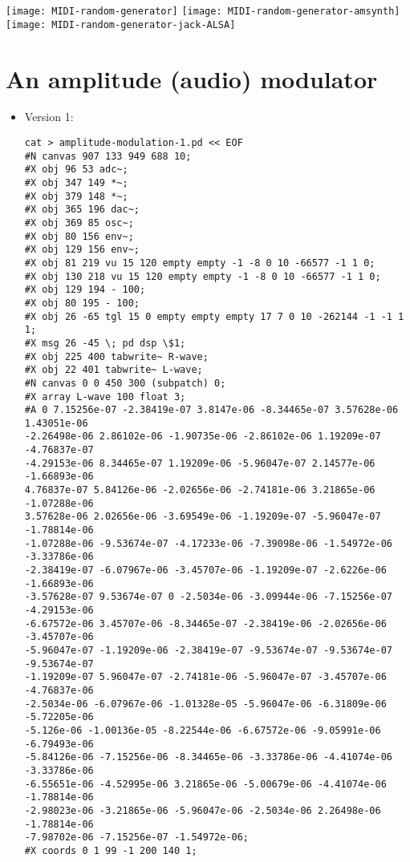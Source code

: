 \begin{center}
  \texttt{[image: MIDI-random-generator]}
  \texttt{[image: MIDI-random-generator-amsynth]}
  \texttt{[image: MIDI-random-generator-jack-ALSA]}
\end{center}


\section{An amplitude (audio) modulator}
\begin{itemize}
\item Version 1:
\begin{verbatim}
cat > amplitude-modulation-1.pd << EOF
#N canvas 907 133 949 688 10;
#X obj 96 53 adc~;
#X obj 347 149 *~;
#X obj 379 148 *~;
#X obj 365 196 dac~;
#X obj 369 85 osc~;
#X obj 80 156 env~;
#X obj 129 156 env~;
#X obj 81 219 vu 15 120 empty empty -1 -8 0 10 -66577 -1 1 0;
#X obj 130 218 vu 15 120 empty empty -1 -8 0 10 -66577 -1 1 0;
#X obj 129 194 - 100;
#X obj 80 195 - 100;
#X obj 26 -65 tgl 15 0 empty empty empty 17 7 0 10 -262144 -1 -1 1
1;
#X msg 26 -45 \; pd dsp \$1;
#X obj 225 400 tabwrite~ R-wave;
#X obj 22 401 tabwrite~ L-wave;
#N canvas 0 0 450 300 (subpatch) 0;
#X array L-wave 100 float 3;
#A 0 7.15256e-07 -2.38419e-07 3.8147e-06 -8.34465e-07 3.57628e-06 1.43051e-06
-2.26498e-06 2.86102e-06 -1.90735e-06 -2.86102e-06 1.19209e-07 -4.76837e-07
-4.29153e-06 8.34465e-07 1.19209e-06 -5.96047e-07 2.14577e-06 -1.66893e-06
4.76837e-07 5.84126e-06 -2.02656e-06 -2.74181e-06 3.21865e-06 -1.07288e-06
3.57628e-06 2.02656e-06 -3.69549e-06 -1.19209e-07 -5.96047e-07 -1.78814e-06
-1.07288e-06 -9.53674e-07 -4.17233e-06 -7.39098e-06 -1.54972e-06 -3.33786e-06
-2.38419e-07 -6.07967e-06 -3.45707e-06 -1.19209e-07 -2.6226e-06 -1.66893e-06
-3.57628e-07 9.53674e-07 0 -2.5034e-06 -3.09944e-06 -7.15256e-07 -4.29153e-06
-6.67572e-06 3.45707e-06 -8.34465e-07 -2.38419e-06 -2.02656e-06 -3.45707e-06
-5.96047e-07 -1.19209e-06 -2.38419e-07 -9.53674e-07 -9.53674e-07 -9.53674e-07
-1.19209e-07 5.96047e-07 -2.74181e-06 -5.96047e-07 -3.45707e-06 -4.76837e-06
-2.5034e-06 -6.07967e-06 -1.01328e-05 -5.96047e-06 -6.31809e-06 -5.72205e-06
-5.126e-06 -1.00136e-05 -8.22544e-06 -6.67572e-06 -9.05991e-06 -6.79493e-06
-5.84126e-06 -7.15256e-06 -8.34465e-06 -3.33786e-06 -4.41074e-06 -3.33786e-06
-6.55651e-06 -4.52995e-06 3.21865e-06 -5.00679e-06 -4.41074e-06 -1.78814e-06
-2.98023e-06 -3.21865e-06 -5.96047e-06 -2.5034e-06 2.26498e-06 -1.78814e-06
-7.98702e-06 -7.15256e-07 -1.54972e-06;
#X coords 0 1 99 -1 200 140 1;

\end{verbatim}
\end{itemize}
